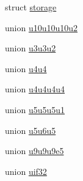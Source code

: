 \begin{DoxyCompactItemize}
struct \hyperlink{structglm_1_1detail_1_1storage}{storage}
\item 
union \hyperlink{unionglm_1_1detail_1_1u10u10u10u2}{u10u10u10u2}
\item 
union \hyperlink{unionglm_1_1detail_1_1u3u3u2}{u3u3u2}
\item 
union \hyperlink{unionglm_1_1detail_1_1u4u4}{u4u4}
\item 
union \hyperlink{unionglm_1_1detail_1_1u4u4u4u4}{u4u4u4u4}
\item 
union \hyperlink{unionglm_1_1detail_1_1u5u5u5u1}{u5u5u5u1}
\item 
union \hyperlink{unionglm_1_1detail_1_1u5u6u5}{u5u6u5}
\item 
union \hyperlink{unionglm_1_1detail_1_1u9u9u9e5}{u9u9u9e5}
\item 
union \hyperlink{unionglm_1_1detail_1_1uif32}{uif32}
\end{DoxyCompactItemize}
